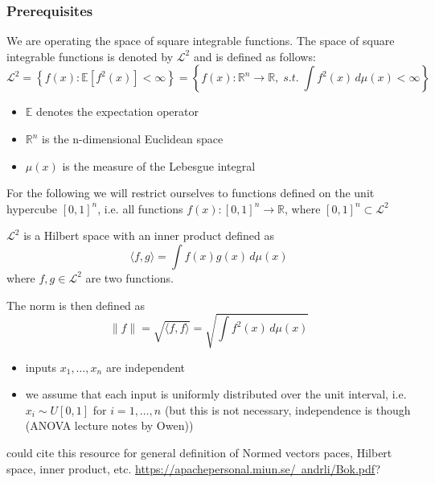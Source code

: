 \subsubsection{Prerequisites}
We are operating the space of square integrable functions. The space of square integrable functions is denoted by $\mathcal{L}^2$ and is defined as follows:
\[
\mathcal{L}^2 = \left\{ f(x) : \mathbb{E}[f^2(x)] < \infty \right\}
= \left\{ f(x) : \mathbb{R}^{n} \to \mathbb{R}, \; \textit{s.t.} \; \int f^2(x)\, d\mu(x) < \infty \right\}
\]
\begin{itemize}
    \item $\mathbb{E}$ denotes the expectation operator
    \item $\mathbb{R}^{n}$ is the n-dimensional Euclidean space
    \item $\mu(x)$ is the measure of the Lebesgue integral
\end{itemize}
For the following we will restrict ourselves to functions defined on the unit hypercube $[0,1]^n$, i.e. all functions $f(x): [0,1]^n \rightarrow \mathbb{R}$, where $[0,1]^n \subset \mathcal{L}^2$ \par
$\mathcal{L}^2$ is a Hilbert space with an inner product defined as
\[
\langle f, g \rangle = \int f(x) g(x) \, d\mu(x)
\]
where $f,g \in \mathcal{L}^2$ are two functions.\par
The norm is then defined as
\[
\|f\| = \sqrt{\langle f, f \rangle} = \sqrt{\int f^2(x) \, d\mu(x)}
\]
\begin{itemize}
    \item inputs $x_1, \dots, x_n$ are independent
    \item we assume that each input is uniformly distributed over the unit interval, i.e. $x_i \sim U[0,1]$ for $i = 1, \dots, n$ (but this is not necessary, independence is though (ANOVA lecture notes by Owen))
\end{itemize}

{\color{blue} could cite this resource for general definition of Normed vectors paces, Hilbert space, inner product, etc. \href{https://apachepersonal.miun.se/~andrli/Bok.pdf}{https://apachepersonal.miun.se/~andrli/Bok.pdf}?}

